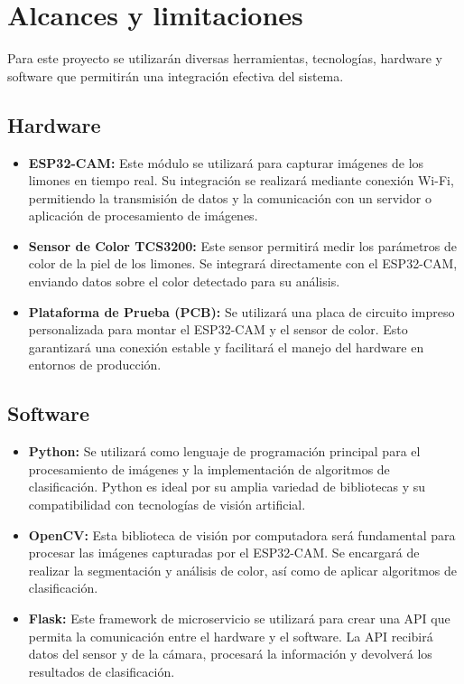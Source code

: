 \section{Alcances y limitaciones}

Para este proyecto se utilizarán diversas herramientas, tecnologías, hardware y software que permitirán una integración efectiva del sistema.

\subsection{Hardware}
\begin{itemize}
    \item \textbf{ESP32-CAM:} Este módulo se utilizará para capturar imágenes de los limones en tiempo real. Su integración se realizará mediante conexión Wi-Fi, permitiendo la transmisión de datos y la comunicación con un servidor o aplicación de procesamiento de imágenes.
    
    \item \textbf{Sensor de Color TCS3200:} Este sensor permitirá medir los parámetros de color de la piel de los limones. Se integrará directamente con el ESP32-CAM, enviando datos sobre el color detectado para su análisis.
    
    \item \textbf{Plataforma de Prueba (PCB):} Se utilizará una placa de circuito impreso personalizada para montar el ESP32-CAM y el sensor de color. Esto garantizará una conexión estable y facilitará el manejo del hardware en entornos de producción.
\end{itemize}

\subsection{Software}
\begin{itemize}
    \item \textbf{Python:} Se utilizará como lenguaje de programación principal para el procesamiento de imágenes y la implementación de algoritmos de clasificación. Python es ideal por su amplia variedad de bibliotecas y su compatibilidad con tecnologías de visión artificial.
    
    \item \textbf{OpenCV:} Esta biblioteca de visión por computadora será fundamental para procesar las imágenes capturadas por el ESP32-CAM. Se encargará de realizar la segmentación y análisis de color, así como de aplicar algoritmos de clasificación.
    
    \item \textbf{Flask:} Este framework de microservicio se utilizará para crear una API que permita la comunicación entre el hardware y el software. La API recibirá datos del sensor y de la cámara, procesará la información y devolverá los resultados de clasificación.
\end{itemize}

